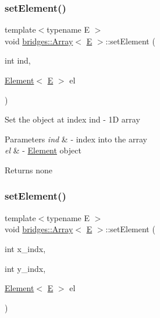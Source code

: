 \subsubsection{\texorpdfstring{setElement()}{setElement()}\hspace{0.1cm}{\footnotesize\ttfamily [1/3]}}
{\footnotesize\ttfamily template$<$typename E $>$ \\
void \mbox{\hyperlink{classbridges_1_1_array}{bridges\+::\+Array}}$<$ \mbox{\hyperlink{namespacebridges_acfb0a4f7877d8f63de3e6862004c50eda3a3ea00cfc35332cedf6e5e9a32e94da}{E}} $>$\+::set\+Element (\begin{DoxyParamCaption}\item[{int}]{ind,  }\item[{\mbox{\hyperlink{classbridges_1_1_element}{Element}}$<$ \mbox{\hyperlink{namespacebridges_acfb0a4f7877d8f63de3e6862004c50eda3a3ea00cfc35332cedf6e5e9a32e94da}{E}} $>$}]{el }\end{DoxyParamCaption})\hspace{0.3cm}{\ttfamily [inline]}}

Set the object at index ind -\/ 1D array


\begin{DoxyParams}{Parameters}
{\em ind} & -\/ index into the array \\
\hline
{\em el} & -\/ \mbox{\hyperlink{classbridges_1_1_element}{Element}} object\\
\hline
\end{DoxyParams}
\begin{DoxyReturn}{Returns}
none 
\end{DoxyReturn}
\mbox{\label{classbridges_1_1_array_a428cc76d22af71c5ae57dc293780b8ec}} 
\subsubsection{\texorpdfstring{setElement()}{setElement()}\hspace{0.1cm}{\footnotesize\ttfamily [2/3]}}
{\footnotesize\ttfamily template$<$typename E $>$ \\
void \mbox{\hyperlink{classbridges_1_1_array}{bridges\+::\+Array}}$<$ \mbox{\hyperlink{namespacebridges_acfb0a4f7877d8f63de3e6862004c50eda3a3ea00cfc35332cedf6e5e9a32e94da}{E}} $>$\+::set\+Element (\begin{DoxyParamCaption}\item[{int}]{x\+\_\+indx,  }\item[{int}]{y\+\_\+indx,  }\item[{\mbox{\hyperlink{classbridges_1_1_element}{Element}}$<$ \mbox{\hyperlink{namespacebridges_acfb0a4f7877d8f63de3e6862004c50eda3a3ea00cfc35332cedf6e5e9a32e94da}{E}} $>$}]{el }\end{DoxyParamCaption})\hspace{0.3cm}{\ttfamily [inline]}}

